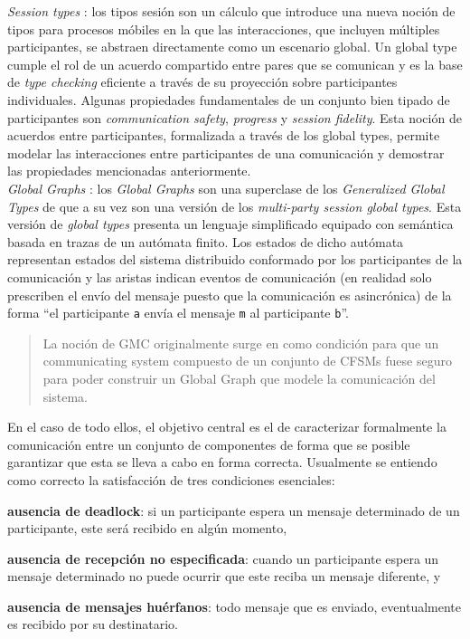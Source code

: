 \emph{Session types} \cite{honda:esop98,honda:popl08}: los tipos sesión son un cálculo que introduce una nueva noción de tipos para procesos móbiles en la que las interacciones, que incluyen múltiples participantes, se abstraen directamente como un escenario global. Un global type cumple el rol de un acuerdo compartido entre pares que se comunican y es la base de \emph{type checking} eficiente a través de su proyección sobre participantes individuales. Algunas propiedades fundamentales de un conjunto bien tipado de participantes son \emph{communication safety}, \emph{progress} y \emph{session fidelity}. Esta noción de acuerdos entre participantes, formalizada a través de los global types, permite modelar las interacciones entre participantes de una comunicación y demostrar las propiedades mencionadas anteriormente.\\

\emph{Global Graphs} \cite{castagna:lmcs-8_1}: los \emph{Global Graphs} son una superclase de los \emph{Generalized Global Types} de \cite{denielou:esop12} que a su vez son una versión de los \emph{multi-party session global types}. Esta versión de \emph{global types} presenta un lenguaje simplificado equipado con semántica basada en trazas de un autómata finito. Los estados de dicho autómata representan estados del sistema distribuido conformado por los participantes de la comunicación y las aristas indican eventos de comunicación (en realidad solo prescriben el envío del mensaje puesto que la comunicación es asincrónica) de la forma ``el participante {\tt a} envía el mensaje {\tt m} al participante {\tt b}''.\\

\begin{quotation}
La noción de GMC originalmente surge en \cite{lange:popl15} como condición para que un communicating system compuesto de un conjunto de CFSMs fuese seguro para poder construir un Global Graph que modele la comunicación del sistema.  
\end{quotation}

En el caso de todo ellos, el objetivo central es el de caracterizar formalmente la comunicación entre un conjunto de componentes de forma que se posible garantizar que esta se lleva a cabo en forma correcta. Usualmente se entiendo como correcto la satisfacción de tres condiciones esenciales:
\begin{inparaenum}[1)]
\item {\bf ausencia de deadlock}: si un participante espera un mensaje determinado de un participante, este será recibido en algún momento, 
\item {\bf ausencia de recepción no especificada}: cuando un participante espera un mensaje determinado no puede ocurrir que este reciba un mensaje diferente, y
\item {\bf ausencia de mensajes huérfanos}: todo mensaje que es enviado, eventualmente es recibido por su destinatario.
\end{inparaenum}

